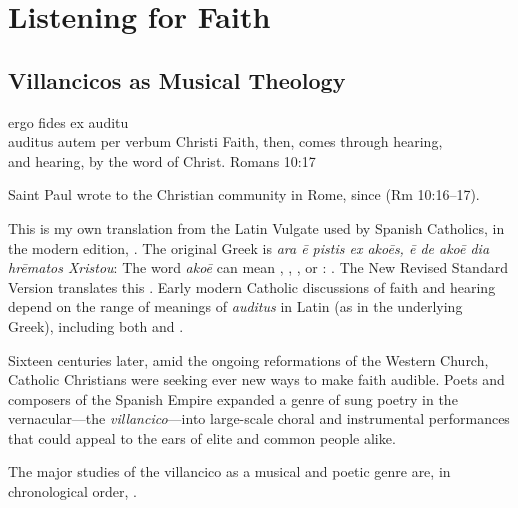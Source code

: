 % 

\part{Listening for Faith}
\label{part:faith}

\chapter{Villancicos as Musical Theology}
\label{ch:intro}

\epigraphTranslation
{ergo fides ex auditu\\
auditus autem per verbum Christi}
{Faith, then, comes through hearing, \\
and hearing, by the word of Christ.}
{Romans 10:17}

Saint Paul wrote to the Christian community in Rome,  since  (Rm 10:16--17).%
\begin{Footnote}
    This is my own translation from the Latin Vulgate used by Spanish Catholics, in
    the modern edition, \autocite{Weber:Vulgate}.
    The original Greek is \emph{ara ē pistis ex akoēs, ē de akoē dia hrēmatos
    Xristou}: \autocite{Aland:GNT4}
    The word \emph{akoē} can mean , , , or : \autocite{BDAG}.
    The New Revised Standard Version translates this .
    Early modern Catholic discussions of faith and hearing depend on the range of
    meanings of \emph{auditus} in Latin (as in the underlying Greek), including both
     and .
\end{Footnote}
Sixteen centuries later, amid the ongoing reformations of the Western Church,
Catholic Christians were seeking ever new ways to make faith audible. 
Poets and composers of the Spanish Empire expanded a genre of sung poetry in the
vernacular---the \emph{villancico}---into large-scale choral and instrumental
performances that could appeal to the ears of elite and common people alike.%
\begin{Footnote}
    The major studies of the villancico as a musical and poetic genre are, in
    chronological order,
    \autocites{Rubio:Forma}{Laird:VC}{Torrente:PhD}{Tenorio:SorJuana}
    {CaberoPueyo:PhD}{Illari:Polychoral}{Knighton-Torrente:VCs}
    {Cashner:Cards}{Cashner:PhD}.
\end{Footnote}

